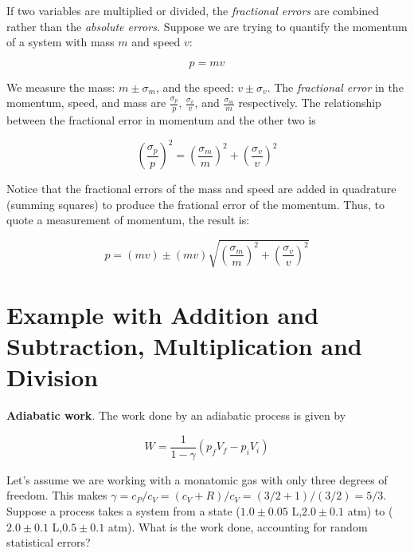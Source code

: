 \documentclass[12pt]{article}
\begin{document}
If two variables are multiplied or divided, the \textit{fractional errors} are combined rather than the \textit{absolute errors.}  Suppose we are trying to quantify the momentum of a system with mass $m$ and speed $v$:

\begin{equation}
p = mv
\end{equation}

We measure the mass: $m\pm \sigma_m$, and the speed: $v\pm\sigma_v$.  The \textit{fractional error} in the momentum, speed, and mass are $\frac{\sigma_p}{p}$, $\frac{\sigma_v}{v}$, and $\frac{\sigma_m}{m}$ respectively.  The relationship between the fractional error in momentum and the other two is

\begin{equation}
\left(\frac{\sigma_p}{p}\right)^2 = \left(\frac{\sigma_m}{m}\right)^2 + \left(\frac{\sigma_v}{v}\right)^2
\end{equation}

Notice that the fractional errors of the mass and speed are added in quadrature (summing squares) to produce the frational error of the momentum.  Thus, to quote a measurement of momentum, the result is:

\begin{equation}
p = (mv) \pm (mv) \sqrt{\left(\frac{\sigma_m}{m}\right)^2 + \left(\frac{\sigma_v}{v}\right)^2}
\end{equation}

\section{Example with Addition and Subtraction, Multiplication and Division}

\textbf{Adiabatic work}. The work done by an adiabatic process is given by

\begin{equation}
W = \frac{1}{1-\gamma} \left( p_f V_f - p_i V_i \right)
\label{eq:W}
\end{equation}

Let's assume we are working with a monatomic gas with only three degrees of freedom.  This makes $\gamma = c_P / c_V = (c_V + R)/c_V = (3/2+1)/(3/2) = 5/3$.  Suppose a process takes a system from a state ($1.0\pm 0.05$ L,$2.0\pm 0.1$ atm) to ($2.0\pm 0.1$ L,$0.5\pm 0.1$ atm).  What is the work done, accounting for random statistical errors?
\end{document}
